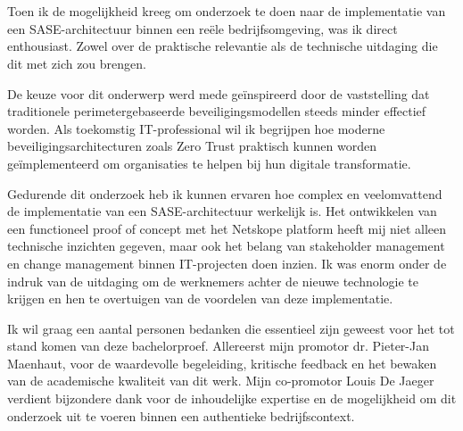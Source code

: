 
\chapter*{}%
\label{ch:voorwoord}


Toen ik de mogelijkheid kreeg om onderzoek te doen naar de implementatie van een SASE-architectuur binnen een reële bedrijfsomgeving, was ik direct enthousiast. Zowel over de praktische relevantie als de technische uitdaging die dit met zich zou brengen.

\vspace{2ex}

De keuze voor dit onderwerp werd mede geïnspireerd door de vaststelling dat traditionele perimetergebaseerde beveiligingsmodellen steeds minder effectief worden. Als toekomstig IT-professional wil ik begrijpen hoe moderne beveiligingsarchitecturen zoals Zero Trust praktisch kunnen worden geïmplementeerd om organisaties te helpen bij hun digitale transformatie.

\vspace{2ex}

Gedurende dit onderzoek heb ik kunnen ervaren hoe complex en veelomvattend de implementatie van een SASE-architectuur werkelijk is. Het ontwikkelen van een functioneel proof of concept met het Netskope platform heeft mij niet alleen technische inzichten gegeven, maar ook het belang van stakeholder management en change management binnen IT-projecten doen inzien. Ik was enorm onder de indruk van de uitdaging om de werknemers achter de nieuwe technologie te krijgen en hen te overtuigen van de voordelen van deze implementatie.

\vspace{2ex}

Ik wil graag een aantal personen bedanken die essentieel zijn geweest voor het tot stand komen van deze bachelorproef. Allereerst mijn promotor dr. Pieter-Jan Maenhaut, voor de waardevolle begeleiding, kritische feedback en het bewaken van de academische kwaliteit van dit werk. Mijn co-promotor Louis De Jaeger verdient bijzondere dank voor de inhoudelijke expertise en de mogelijkheid om dit onderzoek uit te voeren binnen een authentieke bedrijfscontext.

